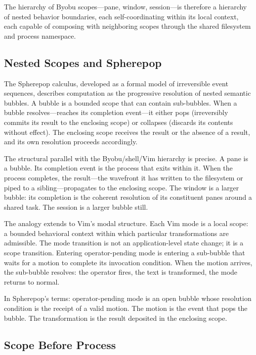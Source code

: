 \documentclass[12pt, a4paper]{article}
\begin{document}
The hierarchy of Byobu scopes---pane, window, session---is
therefore a hierarchy of nested behavior boundaries, each
self-coordinating within its local context, each capable of
composing with neighboring scopes through the shared filesystem
and process namespace.

\subsection{Nested Scopes and Spherepop}

The Spherepop calculus, developed as a formal model of
irreversible event sequences, describes computation as the
progressive resolution of nested semantic bubbles. A bubble
is a bounded scope that can contain sub-bubbles. When a
bubble resolves---reaches its completion event---it either
pops (irreversibly commits its result to the enclosing scope)
or collapses (discards its contents without effect). The
enclosing scope receives the result or the absence of a result,
and its own resolution proceeds accordingly.

The structural parallel with the Byobu/shell/Vim hierarchy is
precise. A pane is a bubble. Its completion event is the
process that exits within it. When the process completes, the
result---the wavefront it has written to the filesystem or
piped to a sibling---propagates to the enclosing scope. The
window is a larger bubble: its completion is the coherent
resolution of its constituent panes around a shared task. The
session is a larger bubble still.

The analogy extends to Vim's modal structure. Each Vim mode is
a local scope: a bounded behavioral context within which
particular transformations are admissible. The mode transition
is not an application-level state change; it is a scope
transition. Entering operator-pending mode is entering a
sub-bubble that waits for a motion to complete its invocation
condition. When the motion arrives, the sub-bubble resolves:
the operator fires, the text is transformed, the mode returns
to normal.

In Spherepop's terms: operator-pending mode is an open bubble
whose resolution condition is the receipt of a valid motion.
The motion is the event that pops the bubble. The transformation
is the result deposited in the enclosing scope.

\subsection{Scope Before Process}
\end{document}
